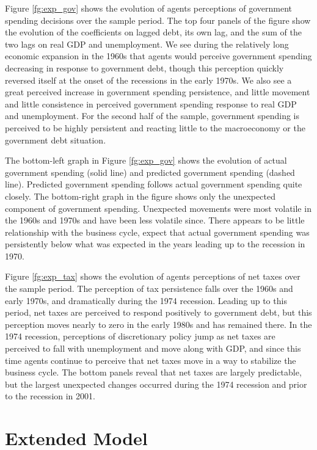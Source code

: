 \documentclass[12pt]{article}
\begin{document}
Figure \ref{fg:exp_gov} shows the evolution of agents perceptions of government spending decisions over the sample period.  The top four panels of the figure show the evolution of the coefficients on lagged debt, its own lag, and the sum of the two lags on real GDP and unemployment.  We see during the relatively long economic expansion in the 1960s that agents would perceive government spending decreasing in response to government debt, though this perception quickly reversed itself at the onset of the recessions in the early 1970s.  We also see a great perceived increase in government spending persistence, and little movement and little consistence in perceived government spending response to real GDP and unemployment.  For the second half of the sample, government spending is perceived to be highly persistent and reacting little to the macroeconomy or the government debt situation.

The bottom-left graph in Figure \ref{fg:exp_gov} shows the evolution of actual government spending (solid line) and predicted government spending (dashed line).  Predicted government spending follows actual government spending quite closely.  The bottom-right graph in the figure shows only the unexpected component of government spending.  Unexpected movements were most volatile in the 1960s and 1970s and have been less volatile since.  There appears to be little relationship with the business cycle, expect that actual government spending was persistently below what was expected in the years leading up to the recession in 1970.

Figure \ref{fg:exp_tax} shows the evolution of agents perceptions of net taxes over the sample period.  The perception of tax persistence falls over the 1960s and early 1970s, and dramatically during the 1974 recession.  Leading up to this period, net taxes are perceived to respond positively to government debt, but this perception moves nearly to zero in the early 1980s and has remained there.  In the 1974 recession, perceptions of discretionary policy jump as net taxes are perceived to fall with unemployment and move along with GDP, and since this time agents continue to perceive that net taxes move in a way to stabilize the business cycle.  The bottom panels reveal that net taxes are largely predictable, but the largest unexpected changes occurred during the 1974 recession and prior to the recession in 2001.

\section{Extended Model}
\end{document}
